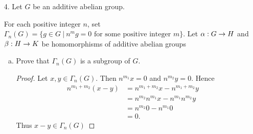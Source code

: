 \begin{itemize}
\begin{enumerate}[(a)]
    \item Prove or disprove: If the matrices $AB$ and $rA + sB$ are nilpotent for all $r, s \in \bbr$, then $AB = BA$.
    \begin{proof}
    Consider 
    $$A = \begin{pmatrix}
0 & a & b \\
0 & 0 & c \\
0 & 0 & 0
\end{pmatrix} \text{ and } 
B = \begin{pmatrix}
0 & d & e \\
0 & 0 & f \\
0 & 0 & 0
\end{pmatrix}.$$
These matrices are nilpotent, so any scalar multiple is, and by above so will their sum be nilpotent. Their products are 
$$AB = \begin{pmatrix}
0 & 0 & af \\
0 & 0 & 0 \\
0 & 0 & 0
\end{pmatrix} \text{ and } 
BA = \begin{pmatrix}
0 & 0 & cd \\
0 & 0 & 0 \\
0 & 0 & 0
\end{pmatrix}.$$    
Both are nilpotent, but not equal in general. 
\end{proof}
\end{enumerate}








\item[4.] Let $G$ be an additive abelian group.

\medskip 

For each positive integer $n$, set $\Gamma_n(G) = \{g \in G \ | \ n^m g = 0 \text{ for some positive integer } m\}$.
Let $\alpha : G \rightarrow H$ and $\beta : H \rightarrow K$ be homomorphisms of additive abelian groups
\begin{enumerate}[(a)]
    \item Prove that $\Gamma_n(G)$ is a subgroup of $G$.
    \begin{proof}
    Let $x,y \in \Gamma_n(G)$. Then $n^{m_1}x = 0$ and $n^{m_2}y = 0$. Hence 
    \begin{align*}
        n^{m_1+m_2} (x-y) &= n^{m_1+m_2}x - n^{m_1+m_2}y \\ 
        &= n^{m_2}n^{m_1}x - n^{m_1}n^{m_2}y \\ 
        &= n^{m_2}0 - n^{m_1}0 \\ 
        &= 0.
    \end{align*}
    Thus $x-y \in \Gamma_n(G)$
    \end{proof}
    

\end{enumerate}
\end{itemize}
